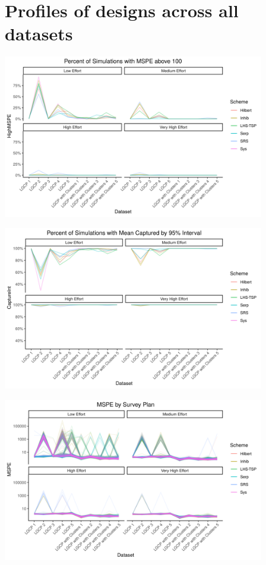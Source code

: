 \documentclass[review]{elsarticle}
\begin{document}
\pagebreak
\appendix
\section{Profiles of designs across all datasets}
\label{profplots}

\includegraphics[width=4.5in]{../graphics/HighMSPE-profile.png}

\includegraphics[width=4.5in]{../graphics/IntCapture-profile.png}

\includegraphics[width=4.5in]{../graphics/MSPE-profile.png}
\end{document}
